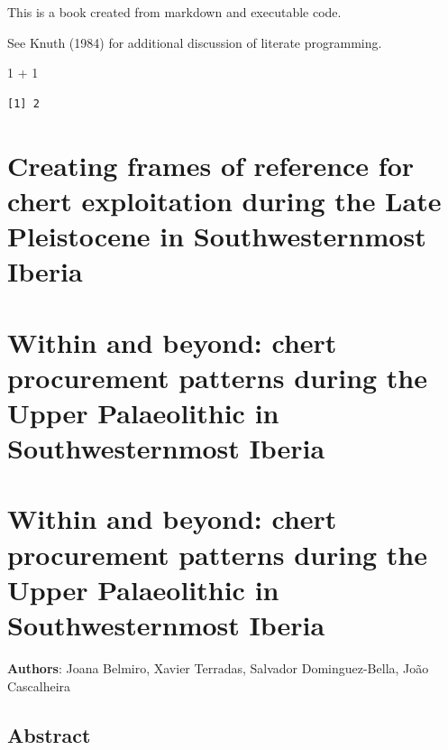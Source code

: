 \documentclass[
  a4paper,
  DIV=11,
  numbers=noendperiod]{scrreprt}
\newenvironment{Shaded}{\begin{snugshade}}{\end{snugshade}}
\newcommand{\DecValTok}[1]{\textcolor[rgb]{0.68,0.00,0.00}{#1}}
\newcommand{\SpecialCharTok}[1]{\textcolor[rgb]{0.37,0.37,0.37}{#1}}
\begin{document}
This is a book created from markdown and executable code.

See Knuth (1984) for additional discussion of literate programming.

\begin{Shaded}
\begin{Highlighting}[]
\DecValTok{1} \SpecialCharTok{+} \DecValTok{1}
\end{Highlighting}
\end{Shaded}

\begin{verbatim}
[1] 2
\end{verbatim}


\chapter{Creating frames of reference for chert exploitation during the
Late Pleistocene in Southwesternmost
Iberia}\label{creating-frames-of-reference-for-chert-exploitation-during-the-late-pleistocene-in-southwesternmost-iberia}


\chapter{Within and beyond: chert procurement patterns during the Upper
Palaeolithic in Southwesternmost
Iberia}\label{within-and-beyond-chert-procurement-patterns-during-the-upper-palaeolithic-in-southwesternmost-iberia}


\chapter{Within and beyond: chert procurement patterns during the Upper
Palaeolithic in Southwesternmost
Iberia}\label{within-and-beyond-chert-procurement-patterns-during-the-upper-palaeolithic-in-southwesternmost-iberia-1}

\textbf{Authors}: Joana Belmiro, Xavier Terradas, Salvador
Dominguez-Bella, João Cascalheira

\newpage

\section*{Abstract}\label{abstract-1}
\end{document}
